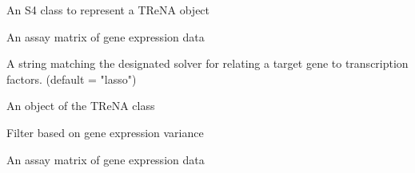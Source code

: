 \documentclass[a4paper]{book}
\begin{document}
%
\begin{Description}\relax
An S4 class to represent a TReNA object
\end{Description}
%
\begin{Arguments}
\begin{ldescription}
\item[\code{mtx.assay}] An assay matrix of gene expression data

\item[\code{solver}] A string matching the designated solver for relating a target gene to transcription factors. (default = "lasso")
\end{ldescription}
\end{Arguments}
%
\begin{Value}
An object of the TReNA class
\end{Value}
%
\begin{Description}\relax
Filter based on gene expression variance
\end{Description}
%
\begin{Arguments}
\begin{ldescription}
\item[\code{mtx.assay}] An assay matrix of gene expression data
\end{ldescription}
\end{Arguments}
\printindex{}
\end{document}
